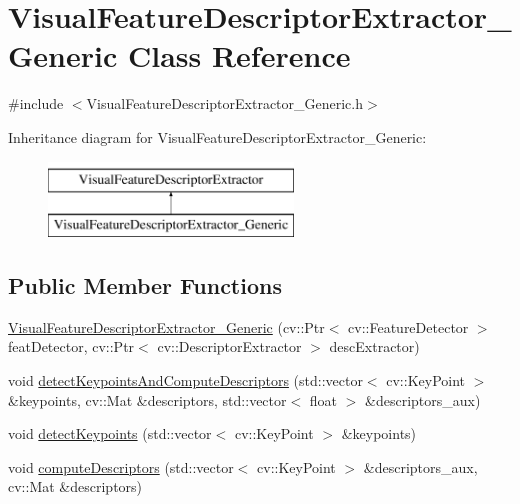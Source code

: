 \hypertarget{class_visual_feature_descriptor_extractor___generic}{
\section{VisualFeatureDescriptorExtractor\_\-Generic Class Reference}
\label{class_visual_feature_descriptor_extractor___generic}
}


{\ttfamily \#include $<$VisualFeatureDescriptorExtractor\_\-Generic.h$>$}

Inheritance diagram for VisualFeatureDescriptorExtractor\_\-Generic:\begin{figure}[H]
\begin{center}
\leavevmode
\includegraphics[height=2.000000cm]{class_visual_feature_descriptor_extractor___generic}
\end{center}
\end{figure}
\subsection*{Public Member Functions}
\begin{DoxyCompactItemize}
\item 
\hyperlink{class_visual_feature_descriptor_extractor___generic_ae3e5c7b0bc31689bb5d0eb408cd592b7}{VisualFeatureDescriptorExtractor\_\-Generic} (cv::Ptr$<$ cv::FeatureDetector $>$ featDetector, cv::Ptr$<$ cv::DescriptorExtractor $>$ descExtractor)
\item 
void \hyperlink{class_visual_feature_descriptor_extractor___generic_adec3d1c762c1010c2e95101822f688b7}{detectKeypointsAndComputeDescriptors} (std::vector$<$ cv::KeyPoint $>$ \&keypoints, cv::Mat \&descriptors, std::vector$<$ float $>$ \&descriptors\_\-aux)
\item 
void \hyperlink{class_visual_feature_descriptor_extractor___generic_a0027ad7b2b0196e31f1829c981488174}{detectKeypoints} (std::vector$<$ cv::KeyPoint $>$ \&keypoints)
\item 
void \hyperlink{class_visual_feature_descriptor_extractor___generic_ad878e967bcf2c00065fbc13af593ff46}{computeDescriptors} (std::vector$<$ cv::KeyPoint $>$ \&descriptors\_\-aux, cv::Mat \&descriptors)
\end{DoxyCompactItemize}
